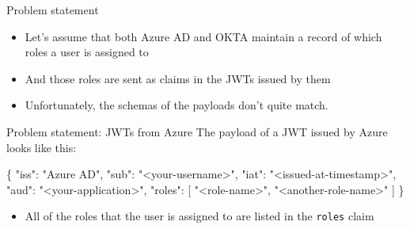 \documentclass[
  9pt,
  ignorenonframetext,
]{beamer}
\newenvironment{Shaded}{}{}
\newcommand{\DataTypeTok}[1]{\textcolor[rgb]{0.56,0.13,0.00}{#1}}
\newcommand{\FunctionTok}[1]{\textcolor[rgb]{0.02,0.16,0.49}{#1}}
\newcommand{\OtherTok}[1]{\textcolor[rgb]{0.00,0.44,0.13}{#1}}
\newcommand{\StringTok}[1]{\textcolor[rgb]{0.25,0.44,0.63}{#1}}
\providecommand{\tightlist}{%
  \setlength{\itemsep}{0pt}\setlength{\parskip}{0pt}}
\begin{document}
\begin{frame}{Problem statement}
\protect\hypertarget{problem-statement-1}{}
\begin{itemize}
\tightlist
\item
  Let's assume that both Azure AD and OKTA maintain a record of which
  roles a user is assigned to
\item
  And those roles are sent as claims in the JWTs issued by them
\item
  Unfortunately, the schemas of the payloads don't quite match.
\end{itemize}



\end{frame}

\begin{frame}[fragile]{Problem statement: JWTs from Azure}
\protect\hypertarget{problem-statement-jwts-from-azure}{}
The payload of a JWT issued by Azure looks like this:

\begin{Shaded}
\begin{Highlighting}[]
\FunctionTok{\{}
  \DataTypeTok{"iss"}\FunctionTok{:} \StringTok{"Azure AD"}\FunctionTok{,}
  \DataTypeTok{"sub"}\FunctionTok{:} \StringTok{"\textless{}your{-}username\textgreater{}"}\FunctionTok{,}
  \DataTypeTok{"iat"}\FunctionTok{:} \StringTok{"\textless{}issued{-}at{-}timestamp\textgreater{}"}\FunctionTok{,}
  \DataTypeTok{"aud"}\FunctionTok{:} \StringTok{"\textless{}your{-}application\textgreater{}"}\FunctionTok{,}
  \DataTypeTok{"roles"}\FunctionTok{:} \OtherTok{[}
     \StringTok{"\textless{}role{-}name\textgreater{}"}\OtherTok{,}
     \StringTok{"\textless{}another{-}role{-}name\textgreater{}"}
  \OtherTok{]}
\FunctionTok{\}}
\end{Highlighting}
\end{Shaded}

\begin{itemize}
\tightlist
\item
  All of the roles that the user is assigned to are listed in the
  \texttt{roles} claim
\end{itemize}





\end{frame}
\end{document}
